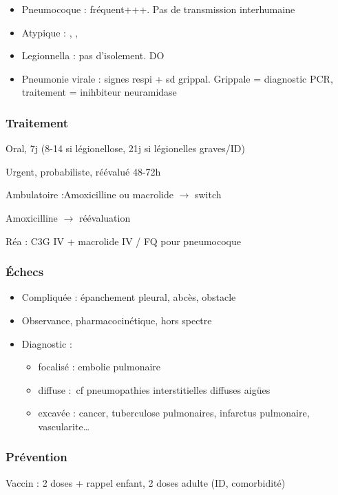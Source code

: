 \documentclass{article}
\newcommand*{\TakeFourierOrnament}[1]{{%
\fontencoding{U}\fontfamily{futs}\selectfont\char#1}}
\newcommand*{\danger}{\TakeFourierOrnament{66}}
\begin{document}
\begin{itemize}
  \item Pneumocoque : fréquent+++. Pas de transmission interhumaine
  \item Atypique : , , 
  \item Legionnella : pas d'isolement. DO
  \item Pneumonie virale : signes respi + sd grippal. Grippale = diagnostic PCR, traitement = inihbiteur neuramidase \danger {}
\end{itemize}
\subsubsection{Traitement}
\label{sec:org48d8e3b}
Oral, 7j (8-14 si légionellose, 21j si légionelles graves/ID)

Urgent, probabiliste, réévalué 48-72h

Ambulatoire :Amoxicilline ou macrolide \(\to\) switch

\faHospitalSign  Amoxicilline \(\to\) réévaluation

Réa : C3G IV + macrolide IV / FQ pour pneumocoque

\subsubsection{Échecs}
\label{sec:orgaaf4c70}
\begin{itemize}
  \item Compliquée : épanchement pleural, abcès, obstacle
  \item Observance, pharmacocinétique, hors spectre
  \item Diagnostic :
    \begin{itemize}
      \item focalisé : embolie pulmonaire
      \item diffuse : cf pneumopathies interstitielles diffuses aigües
      \item excavée : cancer, tuberculose pulmonaires, infarctus pulmonaire, vascularite\ldots{}
    \end{itemize}
\end{itemize}

\subsubsection{Prévention}
Vaccin : 2 doses + rappel enfant, 2 doses adulte (ID, comorbidité)
\end{document}
